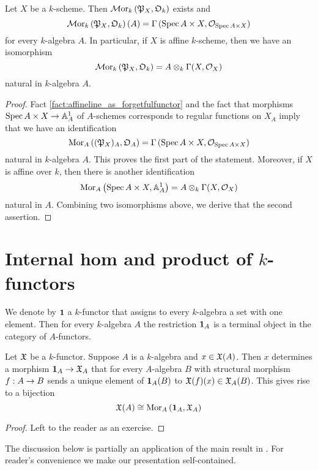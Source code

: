 \begin{proposition}\label{proposition:regular_functions_on_k_schemes}
Let $X$ be a $k$-scheme. Then $\mathcal{M}\mathrm{or}_k\left({\mathfrak P}_X,{\mathfrak O}_k\right)$ exists and
$$\mathcal{M}\mathrm{or}_k\left({\mathfrak P}_X,{\mathfrak O}_k\right)(A) = \Gamma\left(\mathrm{Spec}\, A\times X,{\mathcal O}_{\mathrm{Spec}\, A\times X}\right)$$
for every $k$-algebra $A$. In particular, if $X$ is affine $k$-scheme, then we have an isomorphism
$$\mathcal{M}\mathrm{or}_k\left({\mathfrak P}_X,{\mathfrak O}_k\right) = A\otimes_k\Gamma(X,{\mathcal O}_X)$$
natural in $k$-algebra $A$.
\end{proposition}
\begin{proof}
Fact \ref{fact:affineline_as_forgetfulfunctor} and the fact that morphisms $\mathrm{Spec}\, A\times X\rightarrow \mathbb{A}^1_A$ of $A$-schemes corresponds to regular functions on $X_A$ imply that we have an identification
$$\mathrm{Mor}_A\left(({\mathfrak P}_X)_A,{\mathfrak O}_A\right) = \Gamma\left(\mathrm{Spec}\, A\times X,{\mathcal O}_{\mathrm{Spec}\, A\times X}\right)$$
natural in $k$-algebra $A$. This proves the first part of the statement. Moreover, if $X$ is affine over $k$, then there is another identification
$$\mathrm{Mor}_A\left(\mathrm{Spec}\, A\times X,\mathbb{A}^1_A\right) = A\otimes_k\Gamma(X,{\mathcal O}_X)$$
natural in $A$. Combining two isomorphisms above, we derive that the second assertion.
\end{proof}

\section{Internal hom and product of $k$-functors}
\noindent
We denote by $\mathbf{1}$ a $k$-functor that assigns to every $k$-algebra a set with one element. Then for every $k$-algebra $A$ the restriction $\mathbf{1}_A$ is a terminal object in the category of $A$-functors.

\begin{fact}\label{fact:points_and_morphisms_from_terminal_k_functor}
Let ${\mathfrak X}$ be a $k$-functor. Suppose $A$ is a $k$-algebra and $x\in {\mathfrak X}(A)$. Then $x$ determines a morphism $\mathbf{1}_{A}\rightarrow {\mathfrak X}_A$ that for every $A$-algebra $B$ with structural morphism $f:A\rightarrow B$ sends a unique element of $\mathbf{1}_{A}(B)$ to ${\mathfrak X}(f)(x)\in {\mathfrak X}_A(B)$. This gives rise to a bijection
$${\mathfrak X}(A)\cong \mathrm{Mor}_{A}\left(\mathbf{1}_{A},{\mathfrak X}_A\right)$$
\end{fact}
\begin{proof}
Left to the reader as an exercise.
\end{proof}
\noindent
The discussion below is partially an application of the main result in {\cite[section 6]{Presheaves}}. For reader's convenience we make our presentation self-contained.

